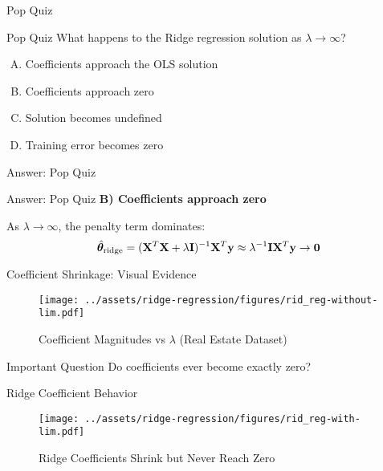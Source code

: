 \documentclass{beamer}
\begin{document}
\begin{frame}{Pop Quiz \thepopquiz}
\begin{popquizbox}{Pop Quiz \thepopquiz}
What happens to the Ridge regression solution as $\lambda \to \infty$?
\begin{enumerate}[A)]
\item Coefficients approach the OLS solution
\item Coefficients approach zero
\item Solution becomes undefined
\item Training error becomes zero
\end{enumerate}
\end{popquizbox}
\end{frame}

\begin{frame}{Answer: Pop Quiz \thepopquiz}
\begin{popquizbox}{Answer: Pop Quiz \thepopquiz}
\textbf{B) Coefficients approach zero}

\vspace{0.3cm}
As $\lambda \to \infty$, the penalty term dominates:
$$\hat{\boldsymbol{\theta}}_{\text{ridge}} = (\mathbf{X}^T\mathbf{X} + \lambda\mathbf{I})^{-1}\mathbf{X}^T\mathbf{y} \approx \lambda^{-1}\mathbf{I} \mathbf{X}^T\mathbf{y} \to \mathbf{0}$$
\end{popquizbox}
\end{frame}

\begin{frame}{Coefficient Shrinkage: Visual Evidence}
\begin{figure}\texttt{[image: ../assets/ridge-regression/figures/rid\_reg-without-lim.pdf]}\caption{{\footnotesize Coefficient Magnitudes vs $\lambda$ (Real Estate Dataset)}}
\end{figure}

\begin{alertbox}{Important Question}
Do coefficients ever become exactly zero?
\end{alertbox}
\end{frame}

\begin{frame}{Ridge Coefficient Behavior}
\begin{figure}\texttt{[image: ../assets/ridge-regression/figures/rid\_reg-with-lim.pdf]}\caption{Ridge Coefficients Shrink but Never Reach Zero}
\end{figure}
\end{frame}
\end{document}
